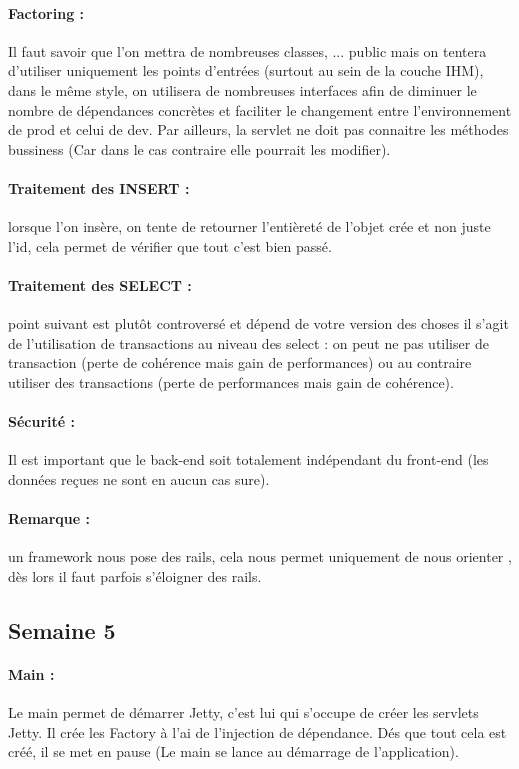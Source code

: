 \documentclass{article}[12pt]
\begin{document}
\paragraph{Factoring : } Il faut savoir que l'on mettra de nombreuses classes, ... public mais on tentera d'utiliser uniquement les points d'entrées (surtout au sein de la couche IHM), dans le même style, on utilisera de nombreuses interfaces afin de diminuer le nombre de dépendances concrètes et faciliter le changement entre l'environnement de prod et celui de dev. Par ailleurs, la servlet ne doit pas connaitre les méthodes bussiness (Car dans le cas contraire elle pourrait les modifier). 
\paragraph{Traitement des INSERT : }lorsque l'on insère, on tente de retourner l'entièreté de l'objet crée et non juste l'id, cela permet de vérifier que tout c'est bien passé. 
\paragraph{Traitement des SELECT : } point suivant est plutôt controversé et dépend de votre version des choses il s'agit de l'utilisation de transactions au niveau des select : on peut ne pas utiliser de transaction (perte de cohérence mais gain de performances) ou au contraire utiliser des transactions (perte de performances mais gain de cohérence). 
\paragraph{Sécurité : } Il est important que le back-end soit totalement indépendant du front-end (les données reçues ne sont en aucun cas sure).
\paragraph{Remarque : } un framework nous pose des rails, cela nous permet uniquement de nous orienter , dès lors il faut parfois s'éloigner des rails.
\subsection{Semaine 5}
\paragraph{Main : } Le main permet de démarrer Jetty, c'est lui qui s'occupe de créer les servlets Jetty. Il crée les Factory à l'ai de l'injection de dépendance. Dés que tout cela est créé, il se met en pause (Le main se lance au démarrage de l'application).
\end{document}
